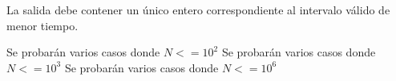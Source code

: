 \documentclass{oci}
\begin{document}
\begin{outputDescription}
  La salida debe contener un único entero correspondiente al intervalo válido de menor tiempo.
\end{outputDescription}

\begin{scoreDescription}
   Se probarán varios casos donde $N<=10^2$
   Se probarán varios casos donde $N<=10^3$
   Se probarán varios casos donde $N<=10^6$
\end{scoreDescription}

\begin{sampleDescription}
\end{sampleDescription}
\end{document}
